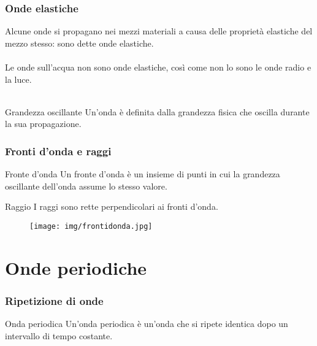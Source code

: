 \documentclass[]{beamer}
\theoremstyle{plain}
\begin{document}
\begin{frame}
  \frametitle{Onde elastiche}
Alcune onde si propagano nei mezzi materiali a causa delle proprietà elastiche del mezzo stesso: sono dette \alert<1>{onde elastiche}.\\~\pause\\
Le onde sull'acqua non sono onde elastiche, così come non lo sono le onde radio e la luce.\\~\pause\\
\begin{block}{Grandezza oscillante}
Un'onda è definita dalla grandezza fisica che oscilla durante la sua propagazione.
\end{block}
\end{frame}


\begin{frame}
  \frametitle{Fronti d'onda e raggi}
\begin{block}{Fronte d'onda}
Un fronte d'onda è un insieme di punti in cui la grandezza oscillante dell'onda assume lo stesso valore.
\end{block}\pause
\begin{block}{Raggio}
I raggi sono rette perpendicolari ai fronti d'onda.
\end{block}
\begin{figure}
        \texttt{[image: img/frontidonda.jpg]}
      \end{figure}
\end{frame}

\section{Onde periodiche}


\begin{frame}
  \frametitle{Ripetizione di onde}
\begin{block}{Onda periodica}
Un'onda periodica è un'onda che si ripete identica dopo un intervallo di tempo costante.
\end{block}
\begin{figure}
\end{figure}
\end{frame}
\end{document}
